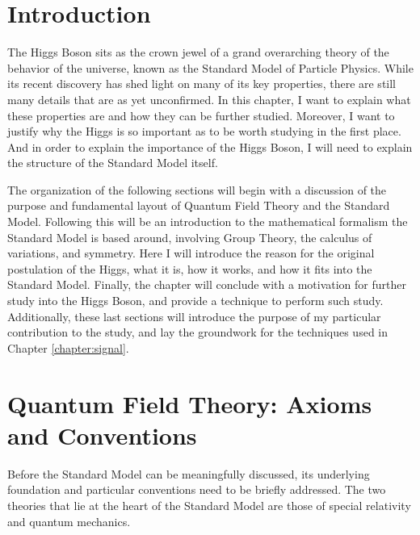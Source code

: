 \section{Introduction}

    The Higgs Boson sits as the crown jewel of a grand overarching theory of the behavior of the universe,
        known as the Standard Model of Particle Physics.
    While its recent discovery has shed light on many of its key properties,
        there are still many details that are as yet unconfirmed.
    In this chapter, I want to explain what these properties are and how they can be further studied.
    Moreover, I want to justify why the Higgs is so important as to be worth studying in the first place.
    And in order to explain the importance of the Higgs Boson,
        I will need to explain the structure of the Standard Model itself.

    The organization of the following sections will begin with a discussion of the purpose and
        fundamental layout of Quantum Field Theory and the Standard Model.
    Following this will be an introduction to the mathematical formalism the Standard Model is based around,
        involving Group Theory, the calculus of variations, and symmetry.
    Here I will introduce the reason for the original postulation of the Higgs, what it is, how it works, and how it fits into the Standard Model.
    Finally, the chapter will conclude with a motivation for further study into the Higgs Boson, and provide a technique to perform such study.
    Additionally, these last sections will introduce the purpose of my particular contribution to the study,
        and lay the groundwork for the techniques used in Chapter \ref{chapter:signal}.


\section{Quantum Field Theory: Axioms and Conventions}

    Before the Standard Model can be meaningfully discussed,
        its underlying foundation and particular conventions need to be briefly addressed.
    The two theories that lie at the heart of the Standard Model are
        those of special relativity and quantum mechanics.


